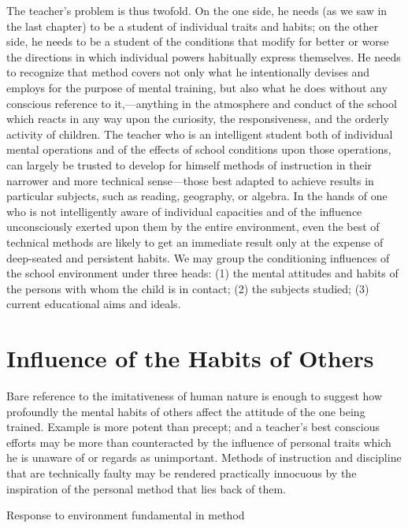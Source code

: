\documentclass[letterpaper]{book}
\begin{document}
The teacher's problem is thus twofold. On the one side, he needs (as we
saw in the last chapter) to be a student of individual traits and
habits; on the other side, he needs to be a student of the conditions
that modify for better or worse the directions in which individual
powers habitually express themselves. He needs to recognize that method
covers not only what he intentionally devises and employs for the
purpose of mental training, but also what he does without any conscious
reference to it,---anything in the atmosphere and conduct of the school
which reacts in any way upon the curiosity, the responsiveness, and the
orderly activity of children. The teacher who is an intelligent student
both of individual mental operations and of the effects of school
conditions upon those operations, can largely be trusted to develop for
himself methods of instruction in their narrower and more technical
sense---those best adapted to achieve results in particular subjects,
such as reading, geography, or algebra. In the hands of one who is not
intelligently aware of individual capacities and of the influence
unconsciously exerted upon them by the entire environment, even the best
of technical methods are likely to get an immediate result only at the
expense of deep-seated and persistent habits. We may group the
conditioning influences of the school environment under three heads: (1)
the mental attitudes and habits of
the
persons with whom the child is in contact; (2) the subjects studied; (3)
current educational aims and ideals.

\section{Influence of the Habits of Others}

Bare reference to the imitativeness of human nature is enough to suggest
how profoundly the mental habits of others affect the attitude of the
one being trained. Example is more potent than precept; and a teacher's
best conscious efforts may be more than counteracted by the influence of
personal traits which he is unaware of or regards as unimportant.
Methods of instruction and discipline that are technically faulty may be
rendered practically innocuous by the inspiration of the personal method
that lies back of them.



Response to environment fundamental in method
\end{document}
